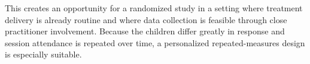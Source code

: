 \documentclass[9pt,a4paper,twocolumn,twoside]{rho-class/rho}
\begin{document}
	This creates an opportunity for a randomized study in a setting where treatment delivery is already routine and where data collection is feasible through close practitioner involvement. Because the children differ greatly in response and session attendance is repeated over time, a personalized repeated-measures design is especially suitable.
	
	
	
	
	\printbibliography
	
	
\end{document}
